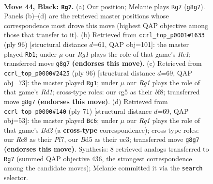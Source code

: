 \documentclass[11pt]{article}
\begin{document}
\clearpage

\begin{figure}[p]\centering
\begin{subfigure}{0.46\textwidth}\centering
\resizebox{\linewidth}{!}{%
\newchessgame
\chessboard[
  setfen={2r1k1r1/p1p5/P1p3p1/2Pb1pRp/1P3P1P/8/8/RN2K3 b Q - 11 44},
  showmover=false,
  pgfstyle=straightmove, color=movearrow, markmove={g8-g7}
]}
\caption{}
\end{subfigure}\hfill
\begin{subfigure}{0.46\textwidth}\centering
\resizebox{\linewidth}{!}{%
\newchessgame
\chessboard[
  setfen={1k6/1p6/p4pp1/P1r5/2Pr1PpP/6P1/R5K1/2R5 w - - 2 49},
  showmover=false,
  pgfstyle=straightmove, color=movearrow, markmove={c1-b1}
]}
\caption{}
\end{subfigure}
\\[4pt]
\begin{subfigure}{0.46\textwidth}\centering
\resizebox{\linewidth}{!}{%
\newchessgame
\chessboard[
  setfen={5b1k/3r3p/p4p2/Pp1PpP2/1Pr1P2R/5K2/3B4/3R4 w - - 0 49},
  showmover=false,
  pgfstyle=straightmove, color=movearrow, markmove={d1-g1}
]}
\caption{}
\end{subfigure}\hfill
\begin{subfigure}{0.46\textwidth}\centering
\resizebox{\linewidth}{!}{%
\newchessgame
\chessboard[
  setfen={8/1prb1p2/p4k2/P4p1p/2P2R2/1PN3PP/8/5K2 b - - 2 36},
  showmover=false,
  pgfstyle=straightmove, color=movearrow, markmove={d7-c6}
]}
\caption{}
\end{subfigure}
\caption{\textbf{Move 44, Black: \texttt{Rg7}.} (a) Our position; Melanie plays \texttt{Rg7} (\texttt{g8g7}). Panels (b)--(d) are the retrieved master positions whose correspondence most drove this move (highest QAP objective among those that transfer to it). (b) Retrieved from \texttt{ccrl\_top\_p0001\#1633} (ply 96) [structural distance $d$=61, QAP obj=101]: the master played \texttt{Rb1}; under $\mu$ our \emph{Rg1} plays the role of that game's \emph{Rc1}; transferred move \texttt{g8g7} \textbf{(endorses this move)}. (c) Retrieved from \texttt{ccrl\_top\_p0000\#2425} (ply 96) [structural distance $d$=69, QAP obj=73]: the master played \texttt{Rg1}; under $\mu$ our \emph{Rg1} plays the role of that game's \emph{Rd1}; cross-type roles: our \emph{r}g5 as their \emph{b}f8; transferred move \texttt{g8g7} \textbf{(endorses this move)}. (d) Retrieved from \texttt{ccrl\_top\_p0000\#140} (ply 71) [structural distance $d$=69, QAP obj=53]: the master played \texttt{Bc6}; under $\mu$ our \emph{Rg1} plays the role of that game's \emph{Bd2} (a \textbf{cross-type} correspondence); cross-type roles: our \emph{R}c8 as their \emph{P}f7, our \emph{B}d5 as their \emph{n}c3; transferred move \texttt{g8g7} \textbf{(endorses this move)}. Synthesis: 8 retrieved analogs transferred to \texttt{Rg7} (summed QAP objective 436, the strongest correspondence among the candidate moves); Melanie committed it via the \texttt{search} selector.}
\label{fig:thought-m87}
\end{figure}
\end{document}
